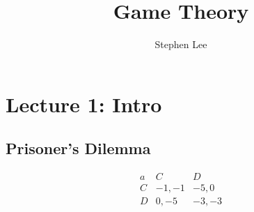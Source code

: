 \documentclass{article}
\author{Stephen Lee}
\title{Game Theory}
\begin{document}
\maketitle

\section{Lecture 1: Intro}

\subsection{Prisoner's Dilemma}
\[ \begin{array}{l|c|c}
a & C & D \\
\hline
C & -1,-1 & -5, 0 \\
\hline
D & 0,-5 & -3,-3
\end{array}
\]
\end{document}
